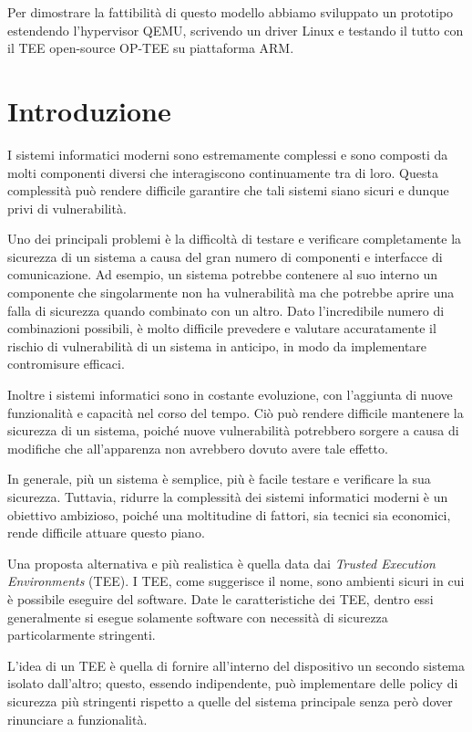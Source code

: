 \documentclass[12pt,italian]{report}
\begin{document}
Per dimostrare la fattibilità di questo modello abbiamo sviluppato un
prototipo estendendo l'hypervisor QEMU, scrivendo un driver Linux e
testando il tutto con il TEE open-source OP-TEE su piattaforma ARM.

\chapter{Introduzione}
\label{sec:introduzione}
I sistemi informatici moderni sono estremamente complessi e sono composti da
molti componenti diversi che interagiscono continuamente tra di loro.
Questa complessità può rendere difficile garantire che tali sistemi siano
sicuri e dunque privi di vulnerabilità.

Uno dei principali problemi è la difficoltà di testare e verificare
completamente la sicurezza di un sistema a causa del gran numero di
componenti e interfacce di comunicazione.
Ad esempio, un sistema potrebbe contenere al suo interno un componente che
singolarmente non ha vulnerabilità ma che potrebbe aprire una falla di
sicurezza quando combinato con un altro.
Dato l'incredibile numero di combinazioni possibili, è molto difficile
prevedere e valutare accuratamente il rischio di vulnerabilità di un sistema
in anticipo, in modo da implementare contromisure efficaci.

Inoltre i sistemi informatici sono in costante evoluzione, con
l'aggiunta di nuove funzionalità e capacità nel corso del tempo.
Ciò può rendere difficile mantenere la sicurezza di un sistema, poiché nuove
vulnerabilità potrebbero sorgere a causa di modifiche che all'apparenza non
avrebbero dovuto avere tale effetto.

In generale, più un sistema è semplice, più è facile testare e verificare
la sua sicurezza. 
Tuttavia, ridurre la complessità dei sistemi informatici moderni è un
obiettivo ambizioso, poiché una moltitudine di fattori, sia tecnici
sia economici, rende difficile attuare questo piano.

Una proposta alternativa e più realistica è quella data dai
\textit{Trusted Execution Environments} (TEE).
I TEE, come suggerisce il nome, sono ambienti sicuri in cui è possibile
eseguire del software. Date le caratteristiche dei TEE, dentro essi
generalmente si esegue solamente software con necessità di sicurezza
particolarmente stringenti.

L'idea di un TEE è quella di fornire all'interno del dispositivo
un secondo sistema isolato dall'altro; questo, essendo
indipendente, può implementare delle policy di sicurezza più
stringenti rispetto a quelle del sistema principale senza però dover
rinunciare a funzionalità.
\end{document}
